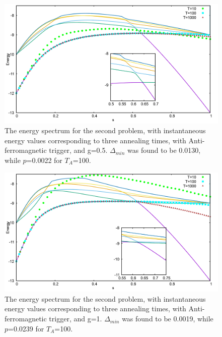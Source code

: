 \documentclass[12]{article}
\begin{document}
\begin{figure}[H]
\centering 
\includegraphics[scale=0.3]{950_s12_A_g0.png}
\caption{The energy spectrum for the second problem, with instantaneous energy values corresponding to three annealing times, with Anti-ferromagnetic trigger, and g=0.5. $\Delta_{min}$ was found to be 0.0130, while $p$=0.0022 for $T_A$=100. }
\label{fig:a4}
\end{figure}
\begin{figure}[H]
\centering 
\includegraphics[scale=0.3]{950_s12_A_g1.png}
\caption{The energy spectrum for the second problem, with instantaneous energy values corresponding to three annealing times, with Anti-ferromagnetic trigger, and g=1. $\Delta_{min}$ was found to be 0.0019, while $p$=0.0239 for $T_A$=100. }
\label{fig:a5}
\end{figure}
\end{document}
